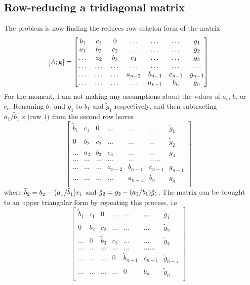 \documentclass[a4paper,english]{article}
\renewcommand\vec{\mathbf}
\let\originalleft\left
\let\originalright\right
\renewcommand{\left}{\mathopen{}\mathclose\bgroup\originalleft}
\renewcommand{\right}{\aftergroup\egroup\originalright}
\begin{document}
\subsection{Row-reducing a tridiagonal matrix}
The problem is now finding the reduces row echelon form of the matrix
\begin{equation}
  \left[A;\vec{g}\right] =
  \begin{bmatrix}
    b_1& c_1 & 0 &\dots   & \dots &\dots & g_1\\
    a_1 & b_2 & c_2 &\dots &\dots &\dots & g_2\\
    \dots & a_2 & b_3 & c_3 & \dots & \dots & g_3\\
    \dots & \dots   & \dots &\dots &\dots & \dots & \dots\\
    \dots & \dots & \dots &a_{n-2} &b_{n-1}& c_{n-1} & g_{n-1}\\
    \dots & \dots & \dots & \dots &a_{n-1} & b_n & g_n\\
  \end{bmatrix}
\end{equation}
For the moment, I am not making any assumptions about the values of $a_i$, $b_i$ or $c_i$. Renaming $b_1$ and $g_1$ to $\tilde{b}_1$ and $\tilde{g}_1$ respectively, and then subtracting $a_1/\tilde{b}_1\times \text{(row 1)}$ from the second row leaves
\begin{equation}
  \begin{bmatrix}
    \tilde{b}_1& c_1 & 0 &\dots   & \dots &\dots & \tilde{g}_1\\
    0 & \tilde{b}_2 & c_2 &\dots &\dots &\dots & \tilde{g}_2\\
    \dots & a_2 & b_3 & c_3 & \dots & \dots & g_3\\
    \dots & \dots   & \dots &\dots &\dots & \dots \dots \\
    \dots & \dots & \dots &a_{n-2} &b_{n-1}& c_{n-1} & g_{n-1}\\
    \dots & \dots & \dots & \dots &a_{n-1} & b_n & g_n\\
  \end{bmatrix}
\end{equation}
where $\tilde{b}_2 = b_2 - \left(a_1/\tilde{b}_1\right)c_1$ and $\tilde{g}_2 = g_2-\left(a_1/b_1\right)\tilde{g}_1$. The matrix can be brought to an upper triangular form by repeating this process, i.e
\begin{equation}
  \begin{bmatrix}
    \tilde{b}_1& c_1 & 0 &\dots   & \dots &\dots & \tilde{g}_1\\
    0 & \tilde{b}_2 & c_2 &\dots &\dots &\dots & \tilde{g}_2\\
    \dots & 0 & \tilde{b}_3 & c_3 & \dots & \dots & \tilde{g}_3\\
    \dots & \dots   & \dots &\dots &\dots & \dots \dots \\
    \dots & \dots & \dots & 0 &\tilde{b}_{n-1}& c_{n-1} & \tilde{g}_{n-1}\\
    \dots & \dots & \dots & \dots & 0 & \tilde{b}_n & \tilde{g}_n\\
  \end{bmatrix}
\end{equation}
\end{document}
